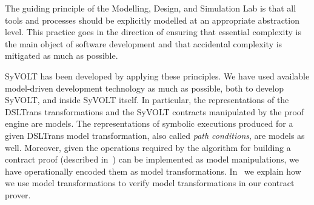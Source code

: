 The guiding principle of the Modelling, Design, and Simulation Lab is that all tools and processes should be
explicitly modelled at an appropriate abstraction level. This
practice goes in the direction of ensuring that essential complexity is the main
object of software development and that accidental complexity is mitigated as
much as possible.

SyVOLT has been developed by applying these principles. We have used available
model-driven development technology as much as possible, both to develop SyVOLT,
and inside SyVOLT itself. In particular, the representations of the DSLTrans
transformations and the SyVOLT contracts manipulated by the proof engine are
models. The representations of symbolic executions produced for a given DSLTrans
model transformation, also called \emph{path conditions}, are models as well.
Moreover, given the operations required by the algorithm for building a contract
proof (described in~\cite{Lucio2014}) can be implemented as model manipulations,
we have operationally encoded them as model transformations.
In~\cite{LucioVang} we explain how we use model transformations to
verify model transformations in our contract prover.

